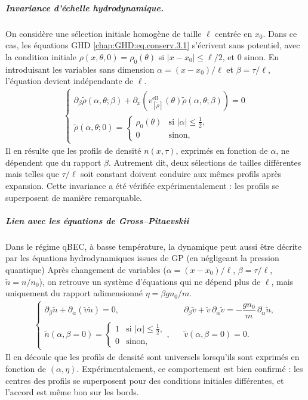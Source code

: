\subparagraph{Invariance d’échelle hydrodynamique.}
On considère une sélection initiale homogène de taille $\ell$ centrée en $x_0$. Dans ce cas, les équations \gls{GHD} \eqref{chap:GHD:eq.conserv.3.1} s’écrivent sans potentiel, avec la condition initiale $\rho(x,\theta,0)=\rho_0(\theta)$ si $|x-x_0|\leq \ell/2$, et $0$ sinon. En introduisant les variables sans dimension $\alpha=(x-x_0)/\ell$ et $\beta=\tau/\ell$, l’équation devient indépendante de $\ell$. 
\begin{eqnarray*}
	\left \{ 
	\begin{array}{rcl}
		\partial_\beta \tilde{\rho} ( \alpha , \theta ; \beta ) +  \partial_x ( v^{\mathrm{ell}}_{[\tilde{\rho}]} (\theta)  \tilde{\rho} ( \alpha , \theta ; \beta )) = 0 \\
		\tilde{\rho} ( \alpha , \theta ; 0 )	 = \begin{cases}
			\rho_0(\theta) & \text{si } |\alpha|\leq \tfrac{1}{2}, \\
			0 & \text{sinon},
		\end{cases}%
	\end{array}
	\right .
\end{eqnarray*}
Il en résulte que les profils de densité $n(x,\tau)$, exprimés en fonction de $\alpha$, ne dépendent que du rapport $\beta$. 
Autrement dit, deux sélections de tailles différentes mais telles que $\tau/\ell$ soit constant doivent conduire aux mêmes profils après expansion. Cette invariance a été vérifiée expérimentalement : les profils se superposent de manière remarquable.

\subparagraph{Lien avec les équations de Gross–Pitaevskii}
Dans le régime \gls{qBEC}, à basse température, la dynamique peut aussi être décrite par les équations hydrodynamiques issues de \gls{GP} (en négligeant la pression quantique) 
Après changement de variables ($\alpha=(x-x_0)/\ell$, $\beta=\tau/\ell$, $\tilde n=n/n_0$), on retrouve un système d’équations qui ne dépend plus de $\ell$, mais uniquement du rapport adimensionné $\eta=\beta g n_0/m$.
\begin{eqnarray*}
	\left \{ 
	\begin{array}{rcl}
		\partial_\beta \tilde n + \partial_\alpha ( \tilde v \tilde n) = 0, && \partial_\beta \tilde v + \tilde v \,\partial_\alpha \tilde v = - \dfrac{g n_0}{m}\,\partial_\alpha \tilde n, \\[6pt]
	\tilde n(\alpha,\beta=0) = 
		\begin{cases}
			1 & \text{si } |\alpha|\leq \tfrac{1}{2}, \\
			0 & \text{sinon},
		\end{cases}, && 
\tilde v(\alpha,\beta=0)=0.
	\end{array}
	\right.
\end{eqnarray*}
Il en découle que les profils de densité sont universels lorsqu’ils sont exprimés en fonction de $(\alpha,\eta)$. Expérimentalement, ce comportement est bien confirmé : les centres des profils se superposent pour des conditions initiales différentes, et l’accord est même bon sur les bords.

